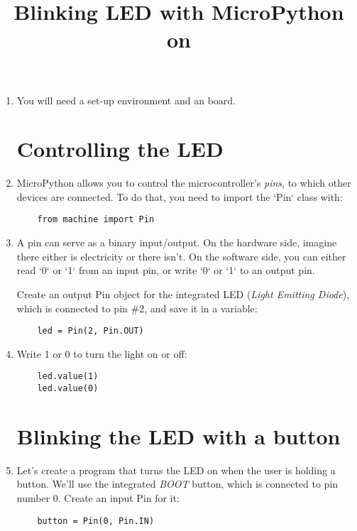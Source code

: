 \documentclass{../tutorial}
\title{Blinking LED with MicroPython on \abbr{ESP32}}
\begin{document}
\begin{enumerate}

\item
    You will need a set-up environment and an  board.

\section{Controlling the LED}

\item
    MicroPython allows you to control the microcontroller's \emph{pins},
    to which other devices are connected.
    To do that, you need to import the `Pin` class with:

    \begin{lstlisting}
    from machine import Pin
    \end{lstlisting}

\item
    A pin can serve as a binary input/output.
    On the hardware side, imagine there either is electricity or there isn't.
    On the software side, you can either read `0` or `1` from an
    input pin, or write `0` or `1` to an output pin.

    Create an output Pin object for the integrated LED (\emph{Light Emitting Diode}),
    which is connected to pin \#2, and save it in a variable:

    \begin{lstlisting}
    led = Pin(2, Pin.OUT)
    \end{lstlisting}

\item
    Write 1 or 0 to turn the light on or off:

    \begin{lstlisting}
    led.value(1)
    led.value(0)
    \end{lstlisting}

\section{Blinking the LED with a button}

\item
    Let's create a program that turns the LED on when the user is holding a button.
    We'll use the integrated \emph{BOOT} button, which is connected to pin number 0.
    Create an input Pin for it:

    \begin{lstlisting}
    button = Pin(0, Pin.IN)
    \end{lstlisting}


\end{enumerate}
\end{document}
